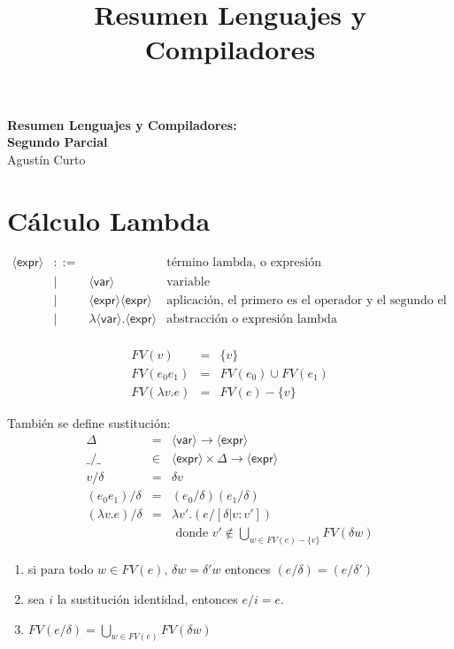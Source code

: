 \documentclass[12pt,a4paper]{article}
\title{Resumen Lenguajes y Compiladores}
\newcommand{\PN}{\par\noindent}
\newcommand{\nonterminal}[1]{\langle \mathsf{#1} \rangle}
\newcommand{\expr}{\nonterminal{expr}}
\newcommand{\var}{\nonterminal{var}}
\begin{document}
	\begin{center}
		\Huge \textbf{Resumen Lenguajes y Compiladores: \\ Segundo Parcial} \\
		\large Agustín Curto
  \end{center}


  \section{Cálculo Lambda}
    \[
      \begin{array}{rcll}
        \expr &::= && \text{término lambda, o expresión} \\
            &|& \var & \text{variable} \\
            &|& \expr \expr & \text{aplicación, el primero es el operador y el segundo el operando} \\
            &|& \lambda \var.\expr & \text{abstracción o expresión lambda} \\
      \end{array}
    \]

    \begin{eqnarray*}
      FV(v) &=& \{v\} \\
      FV(e_0 e_1) &=& FV(e_0)\cup FV(e_1) \\
      FV(\lambda v.e) &=& FV(e) - \{v\}
    \end{eqnarray*}
        
    \PN También se define sustitución:
    \begin{eqnarray*}
      \Delta &=& \var \to \expr \\
      \_/\_ &\in& \expr \times \Delta \to \expr \\
      v/\delta &=& \delta v \\
      (e_0 e_1)/\delta &=& (e_0/\delta) (e_1/\delta) \\
      (\lambda v.e)/\delta &=& \lambda v'.(e/[\delta|v:v']) \\
      && \text{ donde } v' \not\in \bigcup_{w \in FV(e) - \{v\}} FV(\delta w)
    \end{eqnarray*}
        
    \begin{property} \hfill
      \begin{enumerate}
      \item si para todo $w \in FV(e)$, $\delta w = \delta' w$ entonces
        $(e/\delta) = (e/\delta')$
      \item sea $i$ la sustitución identidad, entonces $e/i = e$.
      \item $FV(e/\delta) = \bigcup_{w\in FV(e)} FV(\delta w)$
      \end{enumerate}
    \end{property}
\end{document}
